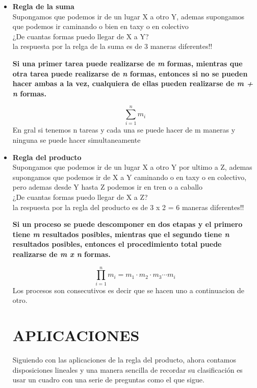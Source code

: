 \documentclass[a4paper,12pt]{article}
\begin{document}
\begin{itemize}
\item \textbf{Regla de la suma}\\   
Supongamos que podemos ir de un lugar X a otro Y, ademas supongamos que podemos ir caminando o bien en taxy o en colectivo \\¿De cuantas formas puedo llegar de X a Y? \\ la respuesta por la relga de la suma es de 3 maneras diferentes!!
\begin{center}
\textbf{
Si una primer tarea puede realizarse de \textit{m} formas, mientras que otra tarea puede realizarse de \textit{n} formas, entonces si no se pueden hacer ambas a la vez, cualquiera de ellas pueden realizarse de \textit{m + n} formas.}

\[
\sum_{i=1}^{n}m_{i}
\]
En gral si tenemos n tareas y cada una se puede hacer de m maneras y ninguna se puede hacer simultaneamente
\end{center}

\item \textbf{Regla del producto}\\  
Supongamos que podemos ir de un lugar X a otro Y por ultimo a Z, ademas supongamos que podemos ir de X a Y caminando o en taxy o en colectivo, pero ademas desde Y hasta Z podemos ir en tren o a caballo\\¿De cuantas formas puedo llegar de X a Z? \\ la respuesta por la regla del producto es de 3 x 2 = 6 maneras diferentes!!
\begin{center}
\textbf{
Si un proceso se puede descomponer en dos etapas y el primero tiene \textit{m} resultados posibles, mientras que el segundo tiene \textit{n} resultados posibles, entonces el procedimiento total puede realizarse de \textit{m x n} formas.}

\[
\prod_{i=1}^{n}m_{i}=m_{1}\cdot m_{2}\cdot m_{3} \cdots m_i 
\]
Los procesos son consecutivos es decir que se hacen uno a continuacion de otro.
\end{center}

\section{APLICACIONES}
Siguiendo con las aplicaciones de la regla del producto, ahora contamos disposiciones lineales y una manera sencilla de recordar su clasificaci\'on es usar un cuadro con una serie de preguntas como el que sigue.


\end{itemize}
\end{document}
